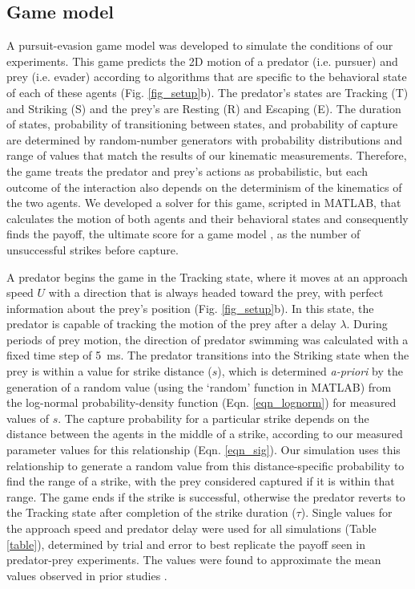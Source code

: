 \documentclass[]{rsos}%
\begin{document}
\subsection{Game model}

A pursuit-evasion game model was developed to simulate the conditions of our experiments. 
This game predicts the 2D motion of a predator (i.e. pursuer) and prey (i.e. evader) according to algorithms that are specific to the behavioral state of each of these agents (Fig. \ref{fig_setup}b). 
The predator's states are Tracking (T) and Striking (S) and the prey's are Resting (R) and Escaping (E). 
The duration of states, probability of transitioning between states, and probability of capture are determined by random-number generators with probability distributions and range of values that match the results of our kinematic measurements.
Therefore, the game treats the predator and prey's actions as probabilistic, but each outcome of the interaction also depends on the determinism of the kinematics of the two agents.
We developed a solver for this game, scripted in MATLAB, that calculates the motion of both agents and their behavioral states and consequently finds the payoff, the ultimate score for a game model \cite{Isaacs:1965uz}, as the number of unsuccessful strikes before capture.

A predator begins the game in the Tracking state, where it moves at an approach speed $U$ with a direction that is always headed toward the prey, with perfect information about the prey's position (Fig. \ref{fig_setup}b). 
In this state, the predator is capable of tracking the motion of the prey after a delay $\lambda$.
During periods of prey motion, the direction of predator swimming was calculated with a fixed time step of \SI{5}{\ms}.  
The predator transitions into the Striking state when the prey is within a value for strike distance ($s$), which is determined \textit{a-priori} by the generation of a random value (using the `random' function in MATLAB) from the log-normal probability-density function (Eqn. \ref{eqn_lognorm}) for measured values of $s$.
The capture probability for a particular strike depends on the distance between the agents in the middle of a strike, according to our measured parameter values for this relationship (Eqn. \ref{eqn_sig}).
Our simulation uses this relationship to generate a random value from this distance-specific probability to find the range of a strike, with the prey considered captured if it is within that range.
The game ends if the strike is successful, otherwise the predator reverts to the Tracking state after completion of the strike duration ($\tau$).
Single values for the approach speed and predator delay were used for all simulations (Table \ref{table}), determined by trial and error to best replicate the payoff seen in predator-prey experiments. The values were found to approximate the mean values observed in prior studies \cite{McHenry:2005tc, Stewart:2013bha}. 
\end{document}
